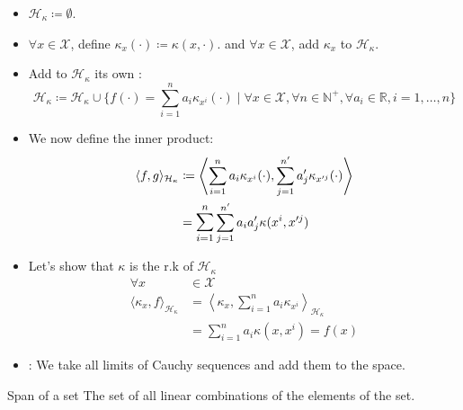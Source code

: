 \begin{itemize}
	\item $\mathcal{H}_\kappa \coloneqq \emptyset$.
	\item $\forall x \in \mathcal{X}$, define $\kappa_x(\cdot) \coloneqq \kappa(x, \cdot)$.
	      and $\forall x \in \mathcal{X}$, add $\kappa_x$ to $\mathcal{H}_\kappa$.
	\item Add to $\mathcal{H}_\kappa$ its own :
	      \begin{equation*}
		      \mathcal{H}_\kappa \coloneqq \mathcal{H}_\kappa \cup \{
		      f(\cdot) = \sum_{i=1}^n a_i \kappa_{x^i}(\cdot) \mid
		      \forall x \in \mathcal{X},
		      \forall n \in \mathds{N}^+,
		      \forall a_i \in \mathds{R},
		      i=1,\dots,n
		      \}
	      \end{equation*}
	\item We now define the inner product:
	      \begin{align*}
		      \langle f, g \rangle_{\mathcal{H}_\kappa} & \coloneqq
		      \left\langle
		      \sum_{i=1}^n a_i \kappa_{x^i}(\cdot), \sum_{j=1}^{n'} a'_j \kappa_{x'^j}(\cdot)
		      \right\rangle                                                                                                          \\
		                                                & = \mathlarger{\sum_{i=1}^n} \sum_{j=1}^{n'} a_i a'_j \kappa({x^i}, {x'^j})
	      \end{align*}
	\item Let's show that $\kappa$ is the r.k of $\mathcal{H}_\kappa$
	      \begin{align*}
		      \forall x                                        & \in \mathcal{X}                          \\
		      \langle \kappa_x, f \rangle_{\mathcal{H}_\kappa} & =
		      \left\langle \kappa_x, \sum_{i=1}^n a_i \kappa_{x^i} \right\rangle_{\mathcal{H}_\kappa}     \\
		                                                       & = \sum_{i=1}^n a_i \kappa(x, x^i) = f(x)
	      \end{align*}
	\item {}: We take all limits of Cauchy sequences
	      and add them to the space.
\end{itemize}

\begin{definition}{Span of a set}{}
	The set of all linear combinations of the elements of the set.
\end{definition}

